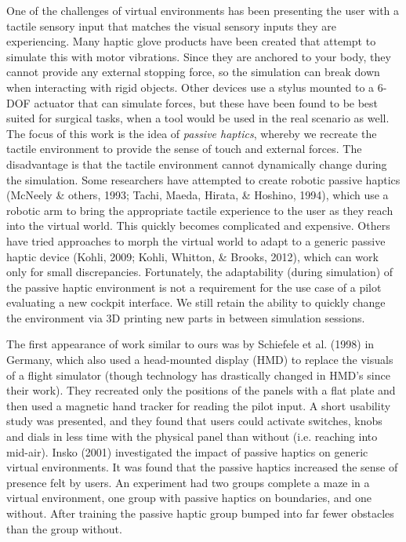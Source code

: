 One of the challenges of virtual environments has been presenting the user with a tactile sensory input that matches the visual sensory inputs they are experiencing. Many haptic glove products have been created that attempt to simulate this with motor vibrations. Since they are anchored to your body, they cannot provide any external stopping force, so the simulation can break down when interacting with rigid objects. Other devices use a stylus mounted to a 6-DOF actuator that can simulate forces, but these have been found to be best suited for surgical tasks, when a tool would be used in the real scenario as well. The focus of this work is the idea of \emph{passive haptics}, whereby we recreate the tactile environment to provide the sense of touch and external forces.  The disadvantage is that the tactile environment cannot dynamically change during the simulation. Some researchers have attempted to create robotic passive haptics (McNeely \& others, 1993; Tachi, Maeda, Hirata, \& Hoshino, 1994), which use a robotic arm to bring the appropriate tactile experience to the user as they reach into the virtual world.  This quickly becomes complicated and expensive. Others have tried approaches to morph the virtual world to adapt to a generic passive haptic device (Kohli, 2009; Kohli, Whitton, \& Brooks, 2012), which can work only for small discrepancies. Fortunately, the adaptability (during simulation) of the passive haptic environment is not a requirement for the use case of a pilot evaluating a new cockpit interface. We still retain the ability to quickly change the environment via 3D printing new parts in between simulation sessions.

The first appearance of work similar to ours was by Schiefele et al.  (1998) in Germany, which also used a head-mounted display (HMD) to replace the visuals of a flight simulator (though technology has drastically changed in HMD's since their work). They recreated only the positions of the panels with a flat plate and then used a magnetic hand tracker for reading the pilot input. A short usability study was presented, and they found that users could activate switches, knobs and dials in less time with the physical panel than without (i.e. reaching into mid-air).  Insko (2001) investigated the impact of passive haptics on generic virtual environments. It was found that the passive haptics increased the sense of presence felt by users. An experiment had two groups complete a maze in a virtual environment, one group with passive haptics on boundaries, and one without. After training the passive haptic group bumped into far fewer obstacles than the group without.

